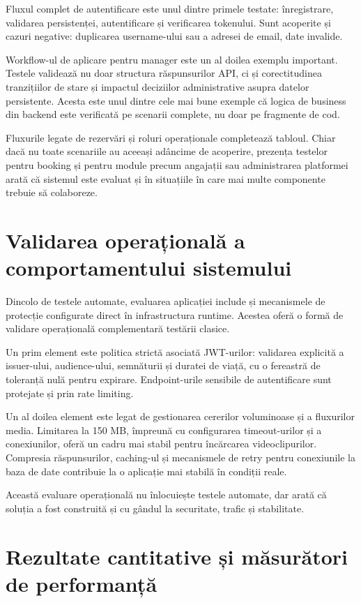 Fluxul complet de autentificare este unul dintre primele testate: înregistrare, validarea persistenței, autentificare și verificarea tokenului. Sunt acoperite și cazuri negative: duplicarea username-ului sau a adresei de email, date invalide.

Workflow-ul de aplicare pentru manager este un al doilea exemplu important. Testele validează nu doar structura răspunsurilor API, ci și corectitudinea tranzițiilor de stare și impactul deciziilor administrative asupra datelor persistente. Acesta este unul dintre cele mai bune exemple că logica de business din backend este verificată pe scenarii complete, nu doar pe fragmente de cod.

Fluxurile legate de rezervări și roluri operaționale completează tabloul. Chiar dacă nu toate scenariile au aceeași adâncime de acoperire, prezența testelor pentru booking și pentru module precum angajații sau administrarea platformei arată că sistemul este evaluat și în situațiile în care mai multe componente trebuie să colaboreze.

\section{Validarea operațională a comportamentului sistemului}

Dincolo de testele automate, evaluarea aplicației include și mecanismele de protecție configurate direct în infrastructura runtime. Acestea oferă o formă de validare operațională complementară testării clasice.

Un prim element este politica strictă asociată JWT-urilor: validarea explicită a issuer-ului, audience-ului, semnăturii și duratei de viață, cu o fereastră de toleranță nulă pentru expirare. Endpoint-urile sensibile de autentificare sunt protejate și prin rate limiting.

Un al doilea element este legat de gestionarea cererilor voluminoase și a fluxurilor media. Limitarea la 150 MB, împreună cu configurarea timeout-urilor și a conexiunilor, oferă un cadru mai stabil pentru încărcarea videoclipurilor. Compresia răspunsurilor, caching-ul și mecanismele de retry pentru conexiunile la baza de date contribuie la o aplicație mai stabilă în condiții reale.

Această evaluare operațională nu înlocuiește testele automate, dar arată că soluția a fost construită și cu gândul la securitate, trafic și stabilitate.

\section{Rezultate cantitative și măsurători de performanță}
\label{sec:rezultate-cantitative}

